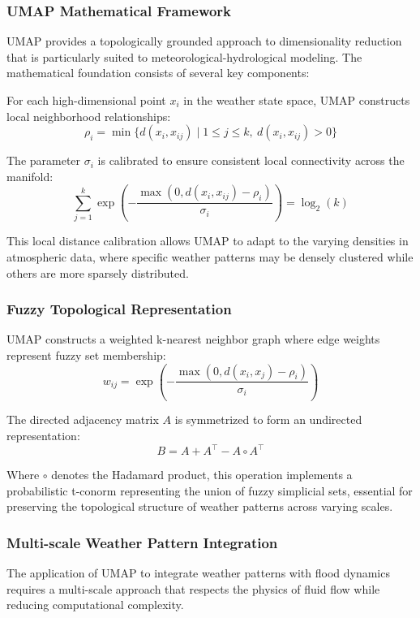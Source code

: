 \documentclass{article}
\begin{document}
\subsubsection{UMAP Mathematical Framework}
UMAP provides a topologically grounded approach to dimensionality reduction that is particularly suited to meteorological-hydrological modeling. The mathematical foundation consists of several key components:

For each high-dimensional point $x_i$ in the weather state space, UMAP constructs local neighborhood relationships:
\begin{equation}
\rho_i = \min \{ d(x_i, x_{ij}) \mid 1 \leq j \leq k, \ d(x_i, x_{ij}) > 0 \}
\end{equation}

The parameter $\sigma_i$ is calibrated to ensure consistent local connectivity across the manifold:
\begin{equation}
\sum_{j=1}^k \exp\left(-\frac{\max(0, d(x_i, x_{ij}) - \rho_i)}{\sigma_i}\right) = \log_2(k)
\end{equation}

This local distance calibration allows UMAP to adapt to the varying densities in atmospheric data, where specific weather patterns may be densely clustered while others are more sparsely distributed.

\subsubsection{Fuzzy Topological Representation}
UMAP constructs a weighted k-nearest neighbor graph where edge weights represent fuzzy set membership:
\begin{equation}
w_{ij} = \exp\left(-\frac{\max(0, d(x_i, x_j) - \rho_i)}{\sigma_i}\right)
\end{equation}

The directed adjacency matrix $A$ is symmetrized to form an undirected representation:
\begin{equation}
B = A + A^\top - A \circ A^\top
\end{equation}

Where $\circ$ denotes the Hadamard product, this operation implements a probabilistic t-conorm representing the union of fuzzy simplicial sets, essential for preserving the topological structure of weather patterns across varying scales.

\subsubsection{Multi-scale Weather Pattern Integration}
The application of UMAP to integrate weather patterns with flood dynamics requires a multi-scale approach that respects the physics of fluid flow while reducing computational complexity.
\end{document}
